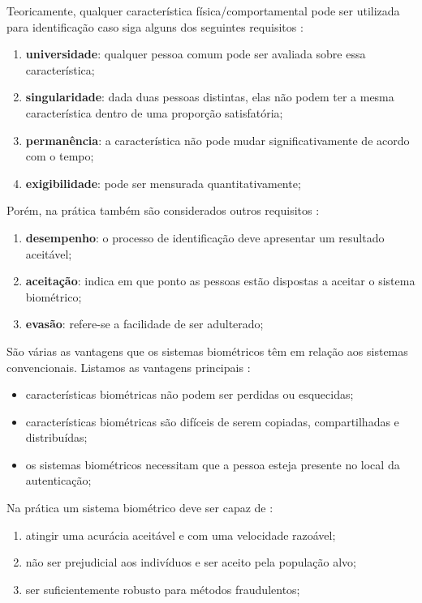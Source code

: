 Teoricamente, qualquer característica física/comportamental pode ser utilizada para identificação caso siga alguns dos seguintes requisitos \cite{milene}: 

	\begin{enumerate}
		\item \textbf{universidade}: qualquer pessoa comum pode ser avaliada sobre essa característica;
		\item \textbf{singularidade}: dada duas pessoas distintas, elas não podem ter a mesma característica dentro de uma proporção satisfatória;
		\item \textbf{permanência}: a característica não pode mudar significativamente de acordo com o tempo;
		\item \textbf{exigibilidade}: pode ser mensurada quantitativamente;
	\end{enumerate}

Porém, na prática também são considerados outros requisitos \cite{milene}:

	\begin{enumerate}
		\item \textbf{desempenho}: o processo de identificação deve apresentar um resultado aceitável;
		\item \textbf{aceitação}: indica em que ponto as pessoas estão dispostas a aceitar o sistema biométrico;
		\item \textbf{evasão}: refere-se a facilidade de ser adulterado;
	\end{enumerate}

São várias as vantagens que os sistemas biométricos têm em relação aos sistemas convencionais. Listamos as vantagens principais \cite{drovetto}:
	
	\begin{itemize}
		\item características biométricas não podem ser perdidas ou esquecidas;
		\item características biométricas são difíceis de serem copiadas, compartilhadas e distribuídas;
		\item os sistemas biométricos necessitam que a pessoa esteja presente no local da autenticação;
	\end{itemize}

Na prática um sistema biométrico deve ser capaz de \cite{hong}:
		
	\begin{enumerate}
		\item atingir uma acurácia aceitável e com uma velocidade razoável;
		\item não ser prejudicial aos indivíduos e ser aceito pela população alvo;
		\item ser suficientemente robusto para métodos fraudulentos;
	\end{enumerate}

